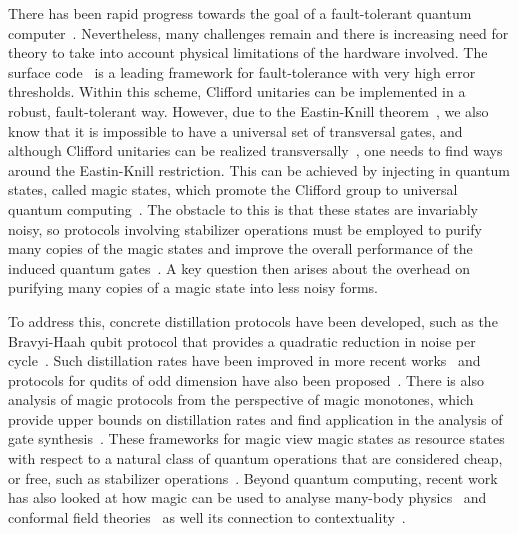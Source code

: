 \documentclass[pra,
aps,
twocolumn,
superscriptaddress,
groupedaddress,
nofootinbib,
reprint
]{revtex4-1}
\begin{document}
There has been rapid progress towards the goal of a fault-tolerant quantum computer~\cite{campbell_roads_2017, cit:raussendorf, Raussendorf_2013, Nickerson_2014, Nikahd_2017, chao_2018, lin_pieceable_2020, Lin_2020, Bourassa_2021}. Nevertheless, many challenges remain and there is increasing need for theory to take into account physical limitations of the hardware involved. The surface code~\cite{Bravyi_1998, Freedman_2001, Dennis_2002, Raussendorf_2007} is a leading framework for fault-tolerance with very high error thresholds. Within this scheme, Clifford unitaries can be implemented in a robust, fault-tolerant way. However, due to the Eastin-Knill theorem~\cite{Eastin_2009}, we also know that it is impossible to have a universal set of transversal gates, and although Clifford unitaries can be realized transversally~\cite{Calderbank_1996, Steane_1996}, one needs to find ways around the Eastin-Knill restriction. This can be achieved by injecting in quantum states, called magic states, which promote the Clifford group to universal quantum computing~\cite{cit:bravyi}. The obstacle to this is that these states are invariably noisy, so protocols involving stabilizer operations must be employed to purify many copies of the magic states and improve the overall performance of the induced quantum gates~\cite{cit:bravyi, Jones_2013, Ogorman_2017}. A key question then arises about the overhead on purifying many copies of a magic state into less noisy forms. 

To address this, concrete distillation protocols have been developed, such as the Bravyi-Haah qubit protocol that provides a quadratic reduction in noise per cycle~\cite{Bravyi2012}. Such distillation rates have been improved in more recent works~\cite{Jones_2013, haah2017magic, Hastings2018, Litinski_2019} and protocols for qudits of odd dimension have also been proposed~\cite{CampbellAnwar_2012, Anwar_2012, Dawkins_2015, Krishna2019, cit:prakash}. There is also analysis of magic protocols from the perspective of magic monotones, which provide upper bounds on distillation rates and find application in the analysis of gate synthesis~\cite{Campbell_2017, Howard_2017, Prakash_2018, Seddon_2021,leone2021renyi}. These frameworks for magic view magic states as resource states with respect to a natural class of quantum operations that are considered cheap, or free, such as stabilizer operations~\cite{Gour_2019, cit:ahmadi, cit:seddon, Wang_2019}. Beyond quantum computing, recent work has also looked at how magic can be used to analyse many-body physics~\cite{Sarkar_2020} and conformal field theories~\cite{White_2021} as well its connection to contextuality~\cite{Vega_2017, cit:howard2, Zurel_2020, Okay_2021}.
\end{document}
